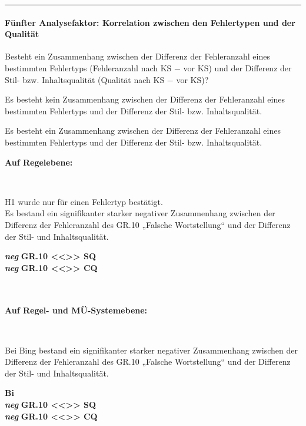 \hrule
\paragraph*{Fünfter Analysefaktor: Korrelation zwischen den Fehlertypen und der Qualität}
\begin{description}[font=\normalfont\bfseries]
\item [Fragestellung:] Besteht ein Zusammenhang zwischen der Differenz der Fehleranzahl eines bestimmten Fehlertyps (Fehleranzahl nach KS $-$ vor KS) und der Differenz der Stil- bzw. Inhaltsqualität (Qualität nach KS $-$ vor KS)?
\item [H0 --] Es besteht kein Zusammenhang zwischen der Differenz der Fehleranzahl eines bestimmten Fehlertyps und der Differenz der Stil- bzw. Inhaltsqualität.
\item [H1 --] Es besteht ein Zusammenhang zwischen der Differenz der Fehleranzahl eines bestimmten Fehlertyps und der Differenz der Stil- bzw. Inhaltsqualität.
\item [Resultat]
\end{description}
\noindent
\parbox[t]{.7\textwidth}{
\textbf{Auf Regelebene:}}\\
\noindent
\parbox[t]{.7\textwidth}{
H1 wurde nur für einen Fehlertyp bestätigt.\\
Es bestand ein signifikanter starker negativer Zusammenhang zwischen der Differenz der Fehleranzahl des GR.10 „Falsche Wortstellung“ und der Differenz der Stil- und Inhaltsqualität.
}
\parbox[t]{.04\textwidth}{}
\colorbox{smGreen}{\parbox[t]{.25\textwidth}{
\textbf{\textit{neg}} \textbf{GR.10 <{}<{}>{}> SQ}\\
\textbf{\textit{neg}} \textbf{GR.10 <{}<{}>{}> CQ}\\
\\
\\
}}

\noindent
\parbox[t]{.7\textwidth}{
\textbf{Auf Regel- und MÜ-Systemebene:}}\\
\noindent
\parbox[t]{.7\textwidth}{
Bei Bing bestand ein signifikanter starker negativer Zusammenhang zwischen der Differenz der Fehleranzahl des GR.10 „Falsche Wortstellung“ und der Differenz der Stil- und Inhaltsqualität.
}
\parbox[t]{.04\textwidth}{}
\colorbox{smGreen}{\parbox[t]{.25\textwidth}{
\textbf{Bi}\\
\textbf{\textit{neg}} \textbf{GR.10 <{}<{}>{}> SQ}\\
\textbf{\textit{neg}} \textbf{GR.10 <{}<{}>{}> CQ}\\
}}

